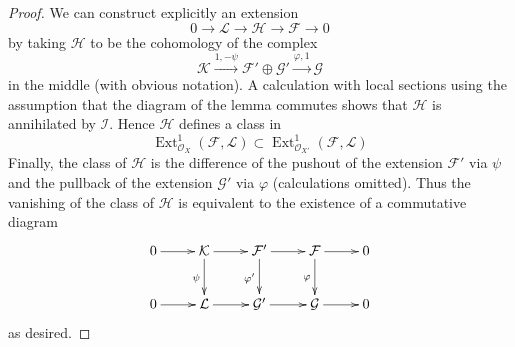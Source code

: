 \documentclass[10pt,a4paper]{amsart}
\theoremstyle{plain}
\theoremstyle{definition}
\theoremstyle{remark}
\numberwithin{equation}{subsection}
\def\Ext{\mathop{\mathrm{Ext}}\nolimits}
\begin{document}
\begin{proof}
We can construct explicitly an extension
$$
0 \to \mathcal{L} \to \mathcal{H} \to \mathcal{F} \to 0
$$
by taking $\mathcal{H}$ to be the cohomology of the complex
$$
\mathcal{K}
\xrightarrow{1, - \psi}
\mathcal{F}' \oplus \mathcal{G}' \xrightarrow{\varphi, 1}
\mathcal{G}
$$
in the middle (with obvious notation). A calculation with local sections
using the assumption that the diagram of the lemma commutes
shows that $\mathcal{H}$ is annihilated by $\mathcal{I}$. Hence
$\mathcal{H}$ defines a class in
$$
\Ext^1_{\mathcal{O}_X}(\mathcal{F}, \mathcal{L})
\subset
\Ext^1_{\mathcal{O}_{X'}}(\mathcal{F}, \mathcal{L})
$$
Finally, the class of $\mathcal{H}$ is the difference of the pushout
of the extension $\mathcal{F}'$ via $\psi$ and the pullback
of the extension $\mathcal{G}'$ via $\varphi$ (calculations omitted).
Thus the vanishing of the class of $\mathcal{H}$ is equivalent to the
existence of a commutative diagram
$$
\xymatrix{
0 \ar[r] &
\mathcal{K} \ar[r] \ar[d]_{\psi} &
\mathcal{F}' \ar[r] \ar[d]_{\varphi'} &
\mathcal{F} \ar[r] \ar[d]_\varphi & 0\\
0 \ar[r] &
\mathcal{L} \ar[r] &
\mathcal{G}' \ar[r] &
\mathcal{G} \ar[r] & 0
}
$$
as desired.
\end{proof}
\end{document}
